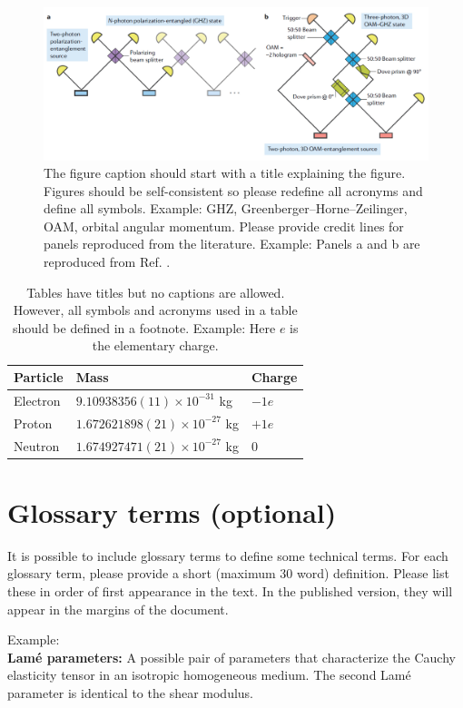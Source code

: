 \documentclass[fleqn,10pt]{wlscirep}
\begin{document}
\begin{figure}[ht]
\centering
\includegraphics[width=\linewidth]{fig}
\caption{The figure caption should start with a title explaining the figure. Figures should be self-consistent so please redefine all acronyms and define all symbols. Example: GHZ, Greenberger–Horne–Zeilinger, OAM, orbital angular momentum. Please provide credit lines for panels reproduced from the literature. Example: Panels a and b are reproduced from Ref. \cite{TR}.}
\label{fig}
\end{figure}

\begin{table}[ht]
\centering
\begin{tabular}{|l|l|l|}
\hline
Particle & Mass & Charge \\
\hline
Electron & $9.10938356(11)\times10^{-31}$ kg & $-1e$ \\
\hline
Proton & $1.672621898(21)\times10^{-27}$ kg & $+1e$ \\
\hline
Neutron & $1.674927471(21)\times10^{-27}$ kg & $0$ \\
\hline
\end{tabular}
\caption{\label{tab}Tables have titles but no captions are allowed. However, all symbols and acronyms used in a table should be defined in a footnote. Example: Here $e$ is the elementary charge.}
\end{table}

\section*{Glossary terms (optional)}
It is possible  to include glossary terms to define some technical terms. For each glossary term, please provide a short (maximum 30 word) definition. Please list these in order of first appearance in the text. In the published version, they will appear in the margins of the document. 

Example: \\
\textbf{Lam\'e parameters:} A possible pair of parameters that characterize the Cauchy elasticity tensor in an isotropic homogeneous medium. The second Lam\'e parameter is identical to the shear modulus.
\end{document}

